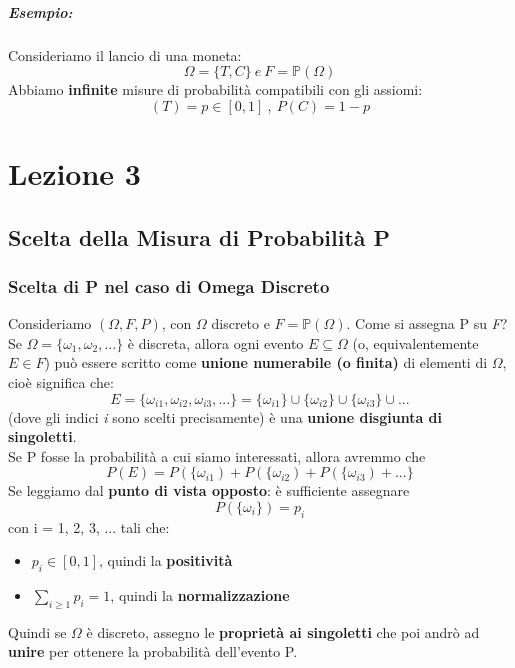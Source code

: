 \documentclass{report}
\newcommand{\Pn}{\mathbb{P}}
\begin{document}
\paragraph{Esempio:} Consideriamo il lancio di una moneta: \[\Omega = \{T,C\}\ e\ \textit{F} = \Pn(\Omega)\]
Abbiamo \textbf{infinite} misure di probabilità compatibili con gli assiomi: \[(T) = p \in [0,1]\ ,\ P(C) = 1 - p\]
\chapter{Lezione 3}
\section{Scelta della Misura di Probabilità P}
\subsection{Scelta di P nel caso di Omega Discreto}
Consideriamo \((\Omega, \textit{F}, P)\), con \(\Omega\) discreto e \(\textit{F} = \Pn(\Omega)\). Come si assegna P su \textit{F}?\\
Se \(\Omega = \{\omega_1, \omega_2, ... \}\) è discreta, allora ogni evento \(E \subseteq \Omega\) (o, equivalentemente \(E \in \textit{F}\)) può essere scritto come \textbf{unione numerabile (o finita)} di elementi di \(\Omega\), cioè significa che: \[E = \{\omega_{i1}, \omega_{i2}, \omega_{i3}, ...\} = \{\omega_{i1}\} \cup \{\omega_{i2}\} \cup \{\omega_{i3}\} \cup ...\] (dove gli indici \textit{i} sono scelti precisamente) è una \textbf{unione disgiunta di singoletti}.\\
Se P fosse la probabilità a cui siamo interessati, allora avremmo che \[P(E) = P(\{\omega_{i1}) + P(\{\omega_{i2}) + P(\{\omega_{i3}) + ...\}\]
Se leggiamo dal \textbf{punto di vista opposto}: è sufficiente assegnare \[P(\{\omega_{i}\}) = p_i\] con i = 1, 2, 3, ... tali che: \begin{itemize}
    \item \(p_i \in [0, 1]\), quindi la \textbf{positività}
    \item \(\sum_{i \geq 1} p_i = 1\), quindi la \textbf{normalizzazione}
\end{itemize}
Quindi se \(\Omega\) è discreto, assegno le \textbf{proprietà ai singoletti} che poi andrò ad \textbf{unire} per ottenere la probabilità dell'evento P.
\end{document}
